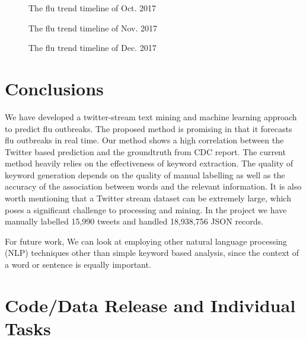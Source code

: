 \documentclass[12pt, oneside]{article}
\begin{document}
\begin{figure}[H]
  \centering
  \scalebox{0.85}{}
  \caption{The flu trend timeline of Oct. 2017}
  \label{figure:3}
\end{figure}

\begin{figure}[H]
  \centering
  \scalebox{0.85}{}
  \caption{The flu trend timeline of Nov. 2017}
  \label{figure:4}
\end{figure}

\begin{figure}[H]
  \centering
  \scalebox{0.85}{}
  \caption{The flu trend timeline of Dec. 2017}
  \label{figure:5}
\end{figure}


\section{Conclusions}


We have developed a twitter-stream text mining and machine learning approach to predict flu outbreaks. 
The proposed method is promising in that it forecasts flu outbreaks in real time. Our method shows a high correlation between the Twitter based prediction
and the groundtruth from CDC report.
The current method heavily relies on the effectiveness of keyword extraction.
The quality of keyword generation depends on the quality of manual labelling as well as the accuracy of the association
between words and the relevant information. It is also worth mentioning that a Twitter stream dataset can be extremely large,
which poses a significant challenge to processing and mining.
In the project we have manually labelled 15,990 tweets and handled 18,938,756 JSON records.

For future work, We can look at employing other natural language processing (NLP) techniques other than simple keyword based analysis, since the context
of a word or sentence is equally important.


\section{Code/Data Release and Individual Tasks}
\end{document}
